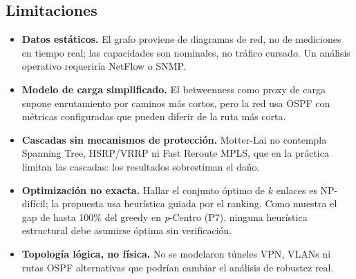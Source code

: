 \documentclass[11pt, a4paper]{article}
\begin{document}
\subsection{Limitaciones}

\begin{itemize}
    \item \textbf{Datos estáticos.} El grafo proviene de diagramas de red,
    no de mediciones en tiempo real; las capacidades son nominales, no
    tráfico cursado. Un análisis operativo requeriría NetFlow o SNMP.

    \item \textbf{Modelo de carga simplificado.} El betweenness como proxy
    de carga supone enrutamiento por caminos más cortos, pero la red usa
    OSPF con métricas configuradas que pueden diferir de la ruta más corta.

    \item \textbf{Cascadas sin mecanismos de protección.} Motter-Lai no
    contempla Spanning Tree, HSRP/VRRP ni Fast Reroute MPLS, que en la
    práctica limitan las cascadas: los resultados sobrestiman el daño.

    \item \textbf{Optimización no exacta.} Hallar el conjunto óptimo de $k$
    enlaces es NP-difícil; la propuesta usa heurística guiada por el
    ranking. Como muestra el gap de hasta 100\% del greedy en
    \textit{p}-Centro (P7), ninguna heurística estructural debe asumirse
    óptima sin verificación.

    \item \textbf{Topología lógica, no física.} No se modelaron túneles VPN,
    VLANs ni rutas OSPF alternativas que podrían cambiar el análisis de
    robustez real.
\end{itemize}

\end{document}
